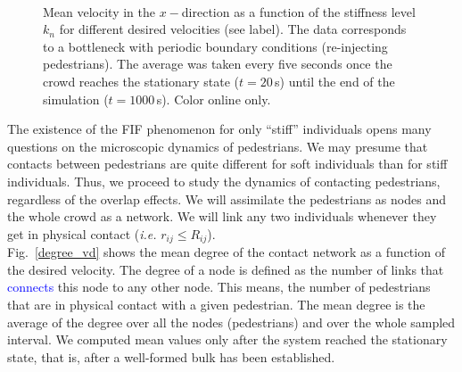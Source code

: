 \documentclass[preprint,12pt]{elsarticle}
\begin{document}
\begin{figure}[!htbp]
\centering
    \\
\caption[width=0.47\columnwidth]{Mean velocity in the $x-$direction as a function 
of the stiffness level $k_n$ for different desired velocities (see label). The 
data corresponds to a bottleneck with periodic boundary conditions (re-injecting 
pedestrians). The average was taken every five seconds once the crowd reaches the 
stationary state ($t=20\,$s) until the end of the simulation ($t=1000\,$s). 
Color online only. }
\label{kn_vs_vx_bottleneck}
\end{figure}


The existence of the FIF phenomenon for only ``stiff'' individuals opens many questions 
on the microscopic dynamics of pedestrians. We may presume that contacts 
between pedestrians are quite different for soft individuals than for stiff 
individuals. Thus, we proceed to study the dynamics of contacting pedestrians, regardless of the overlap 
effects. We will assimilate the pedestrians as nodes and the whole crowd as a 
network. We will link any two individuals whenever they get in physical 
contact (\textit{i.e.} $r_{ij} \leq R_{ij}$).\\

Fig.~\ref{degree_vd} shows the mean degree of the contact network as a function  
of the desired velocity. The degree of a node is defined as the number of links 
that \textcolor{blue}{connects} this node to any other node. This means, the number of pedestrians 
that are in physical contact with a given pedestrian. The mean degree is the 
average of the degree over all the nodes (pedestrians) and over the whole 
sampled interval. We computed mean values only after the system reached the stationary 
state, that is, after a well-formed bulk has been established.\\
\end{document}
